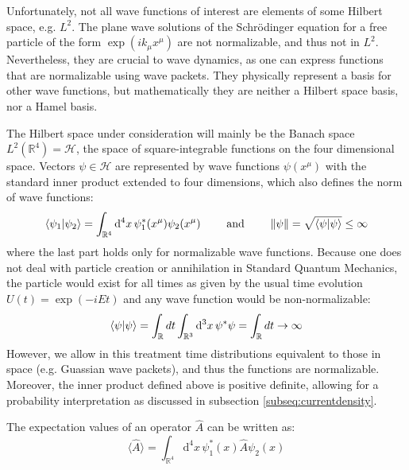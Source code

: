 \documentclass[twoside,a4paper,11pt]{article}
\numberwithin{equation}{section}
\begin{document}
Unfortunately, not all wave functions of interest are elements of some Hilbert space, e.g. $L^2$. The plane wave solutions of the Schr{\"o}dinger equation for a free particle of the form $\exp{\left( i k_\mu x^\mu \right)}$ are not normalizable, and thus not in $L^2$. Nevertheless, they are crucial to wave dynamics, as one can express functions that are normalizable using wave packets. They physically represent a basis for other wave functions, but mathematically they are neither a Hilbert space basis, nor a Hamel basis.

The Hilbert space under consideration will mainly be the Banach space $L^2(\mathbb{R}^4)= \mathcal{H}$, the space of square-integrable functions on the four dimensional space. Vectors $\psi\in\mathcal{H}$ are represented by wave functions $\psi (x^\mu)$ with the standard inner product extended to four dimensions, which also defines the norm of wave functions:
\begin{equation}
    \langle \psi _{1}|\psi _{2}\rangle = \int_{\mathbb{R}^4} {\mathrm  {d}}^4 x \, \psi _{1}^{\ast }(x^\mu) \psi_{2}(x^\mu)  \qquad \text{ and } \qquad  \norm{\psi} = \sqrt{\braket{\psi|\psi}} \leq \infty
    \label{def:innerproduct}
\end{equation}
where the last part holds only for normalizable wave functions. Because one does not deal with particle creation or annihilation in Standard Quantum Mechanics, the particle would exist for all times as given by the usual time evolution $U(t) = \exp{ \left( -i E t\right)} $ and any wave function would be non-normalizable:
\begin{equation}
\braket{\psi|\psi} = \int_{\mathbb{R}} dt \int_{\mathbb{R}^3} {\mathrm  {d}}^3 x \, \psi^{\ast } \psi = \int_{\mathbb{R}} dt \to \infty
\end{equation}
However, we allow in this treatment time distributions equivalent to those in space (e.g. Guassian wave packets), and thus the functions are normalizable. Moreover, the inner product defined above is positive definite, allowing for a probability interpretation as discussed in subsection \ref{subseq:currentdensity}. 

The expectation values of an operator $\hat{A}$ can be written as:
\begin{equation}
    \langle \hat{A} \rangle= \int_{\mathbb{R}^4} {\mathrm  {d}}^4 x \, \psi _{1}^{\ast }(x) \hat{A} \psi_{2}(x) 
\end{equation}
\end{document}
